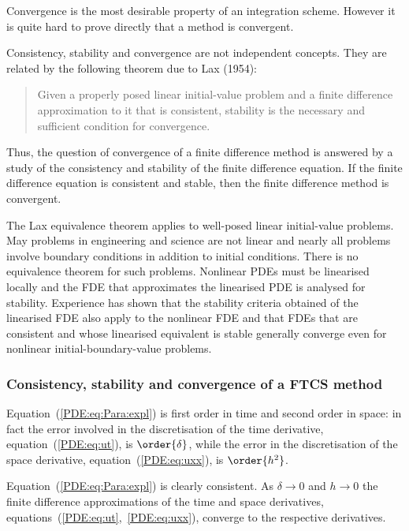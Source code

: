\begin{enumerate}
  Convergence is the most desirable property of an integration scheme.
  However it is quite hard to prove directly that a method is
  convergent.
%
\end{enumerate}

Consistency, stability and convergence are not independent concepts.
They are related by the following theorem due to Lax (1954):

\begin{quote}
  Given a properly posed linear initial-value problem and a finite
  difference approximation to it that is consistent, stability is the
  necessary and sufficient condition for convergence.
\end{quote}

Thus, the question of convergence of a finite difference method is
answered by a study of the consistency and stability of the finite
difference equation.  If the finite difference equation is consistent
and stable, then the finite difference method is convergent.

The Lax equivalence theorem applies to well-posed linear initial-value
problems.  May problems in engineering and science are not linear and
nearly all problems involve boundary conditions in addition to initial
conditions.  There is no equivalence theorem for such problems.
Nonlinear PDEs must be linearised locally and the FDE that
approximates the linearised PDE is analysed for stability.  Experience
has shown that the stability criteria obtained of the linearised FDE
also apply to the nonlinear FDE and that FDEs that are consistent and
whose linearised equivalent is stable generally converge even for
nonlinear initial-boundary-value problems.

\subsubsection{Consistency, stability and convergence of a FTCS
method}

Equation~(\ref{PDE:eq:Para:expl}) is first order in time and second
order in space: in fact the error involved in the discretisation of
the time derivative, equation~(\ref{PDE:eq:ut}), is $\order{\delta}$, while
the error in the discretisation of the space derivative,
equation~(\ref{PDE:eq:uxx}), is $\order{h^2}$.

Equation~(\ref{PDE:eq:Para:expl}) is clearly consistent.  As $\delta
\to 0$ and $h \to 0$ the finite difference approximations of the time
and space derivatives, equations~(\ref{PDE:eq:ut},~\ref{PDE:eq:uxx}),
converge to the respective derivatives.

